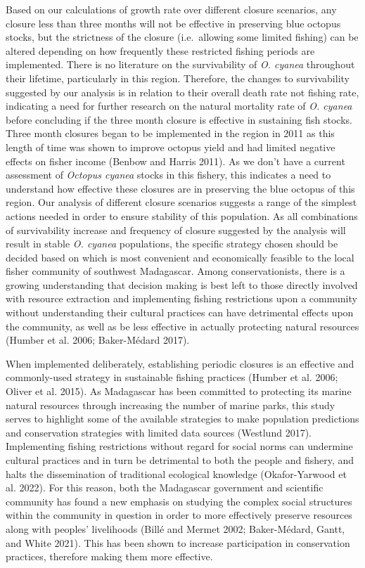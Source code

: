 \documentclass[
]{article}
\begin{document}
Based on our calculations of growth rate over different closure scenarios, any closure less than three months will not be effective in preserving blue octopus stocks, but the strictness of the closure (i.e.~allowing some limited fishing) can be altered depending on how frequently these restricted fishing periods are implemented. There is no literature on the survivability of \emph{O. cyanea} throughout their lifetime, particularly in this region. Therefore, the changes to survivability suggested by our analysis is in relation to their overall death rate not fishing rate, indicating a need for further research on the natural mortality rate of \emph{O. cyanea} before concluding if the three month closure is effective in sustaining fish stocks. Three month closures began to be implemented in the region in 2011 as this length of time was shown to improve octopus yield and had limited negative effects on fisher income (Benbow and Harris 2011). As we don't have a current assessment of \emph{Octopus cyanea} stocks in this fishery, this indicates a need to understand how effective these closures are in preserving the blue octopus of this region. Our analysis of different closure scenarios suggests a range of the simplest actions needed in order to ensure stability of this population. As all combinations of survivability increase and frequency of closure suggested by the analysis will result in stable \emph{O. cyanea} populations, the specific strategy chosen should be decided based on which is most convenient and economically feasible to the local fisher community of southwest Madagascar. Among conservationists, there is a growing understanding that decision making is best left to those directly involved with resource extraction and implementing fishing restrictions upon a community without understanding their cultural practices can have detrimental effects upon the community, as well as be less effective in actually protecting natural resources (Humber et al. 2006; Baker-Médard 2017).

When implemented deliberately, establishing periodic closures is an effective and commonly-used strategy in sustainable fishing practices (Humber et al. 2006; Oliver et al. 2015). As Madagascar has been committed to protecting its marine natural resources through increasing the number of marine parks, this study serves to highlight some of the available strategies to make population predictions and conservation strategies with limited data sources (Westlund 2017). Implementing fishing restrictions without regard for social norms can undermine cultural practices and in turn be detrimental to both the people and fishery, and halts the dissemination of traditional ecological knowledge (Okafor-Yarwood et al. 2022). For this reason, both the Madagascar government and scientific community has found a new emphasis on studying the complex social structures within the community in question in order to more effectively preserve resources along with peoples' livelihoods (Billé and Mermet 2002; Baker-Médard, Gantt, and White 2021). This has been shown to increase participation in conservation practices, therefore making them more effective.
\end{document}
